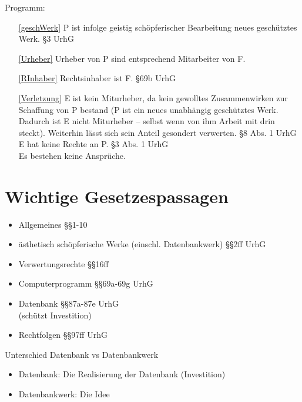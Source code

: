 \documentclass{scrreprt}
\begin{document}
\noindent{}Programm:
\begin{itemize}
\item[\ref{geschWerk}] P ist infolge geistig schöpferischer Bearbeitung neues geschütztes Werk. \hfill §3 UrhG
\item[\ref{Urheber}] Urheber von P sind entsprechend Mitarbeiter von F.
\item[\ref{RInhaber}] Rechtsinhaber ist F. \hfill §69b UrhG
\item[\ref{Verletzung}] E ist kein Miturheber, da kein gewolltes Zusammenwirken zur Schaffung von P bestand (P ist ein neues unabhängig geschütztes Werk. Dadurch ist E nicht Miturheber -- selbst wenn von ihm Arbeit mit drin steckt). Weiterhin lässt sich sein Anteil gesondert verwerten. \hfill §8 Abs. 1 UrhG\\
E hat keine Rechte an P. \hfill §3 Abs. 1 UrhG\\
Es bestehen keine Ansprüche. 
\end{itemize}







\chapter{Wichtige Gesetzespassagen}
\begin{itemize}
\item Allgemeines \hfill §§1-10
\item ästhetisch schöpferische Werke (einschl. Datenbankwerk) \hfill §§2ff UrhG
\item Verwertungsrechte \hfill §§16ff
\item Computerprogramm \hfill §§69a-69g UrhG
\item Datenbank \hfill §§87a-87e UrhG\\
(schützt Investition)
\item Rechtfolgen \hfill §§97ff UrhG
\end{itemize}

Unterschied Datenbank vs Datenbankwerk
\begin{itemize}
\item Datenbank: Die Realisierung der Datenbank (Investition)
\item Datenbankwerk: Die Idee
\end{itemize}
\end{document}
